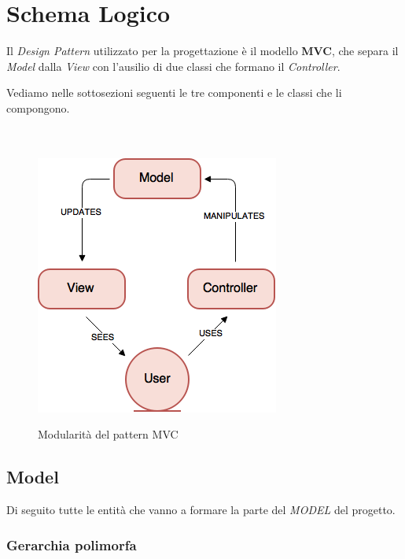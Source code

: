 \documentclass[10pt,a4paper,openany]{article}
\begin{document}
\section{Schema Logico}	

Il \textit{Design Pattern} utilizzato per la progettazione è il modello \textbf{MVC}, che separa il \textit{Model} dalla \textit{View} con l'ausilio di due classi che formano il \textit{Controller}.

Vediamo nelle sottosezioni seguenti le tre componenti e le classi che li compongono.\\\\\\


\begin{figure}[!h]
\centering
\includegraphics[angle=0,scale=.45]{MVC.png}\\
\caption{Modularità del pattern MVC}
\label{fig:MVC}
\end{figure}


\newpage

	\subsection{Model}
	
	Di seguito tutte le entità che vanno a formare la parte del \emph{MODEL} del progetto.
	
		\subsubsection{Gerarchia polimorfa}
	
\end{document}

